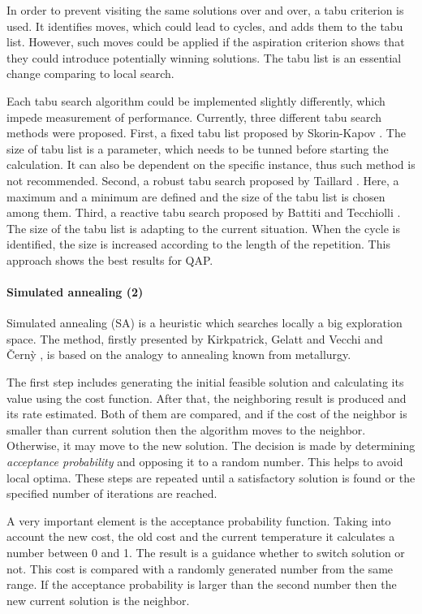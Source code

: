 In order to prevent visiting the same solutions over and over, a tabu criterion is used.
It identifies moves, which could lead to cycles, and adds them to the tabu list.
However, such moves could be applied if the aspiration criterion shows that they could introduce potentially winning solutions.
The tabu list is an essential change comparing to local search.

Each tabu search algorithm could be implemented slightly differently, which impede measurement of performance.
Currently, three different tabu search methods were proposed.
First, a fixed tabu list proposed by Skorin-Kapov \cite{skorin1990tabu}.
The size of tabu list is a parameter, which needs to be tunned before starting the calculation.
It can also be dependent on the specific instance, thus such method is not recommended.
Second, a robust tabu search proposed by Taillard \cite{taillard1991robust}.
Here, a maximum and a minimum are defined and the size of the tabu list is chosen among them.
Third, a reactive tabu search proposed by Battiti and Tecchiolli \cite{battiti1994reactive}.
The size of the tabu list is adapting to the current situation.
When the cycle is identified, the size is increased according to the length of the repetition.
This approach shows the best results for QAP.

\paragraph{Simulated annealing (2)}

Simulated annealing (SA) is a heuristic which searches locally a big exploration space.
The method, firstly presented by Kirkpatrick, Gelatt and Vecchi \cite{kirkpatrick1983optimization} and {\v{C}}ern{\`y} \cite{vcerny1985thermodynamical}, is based on the analogy to annealing known from metallurgy.

The first step includes generating the initial feasible solution and calculating its value using the cost function.
After that, the neighboring result is produced and its rate estimated.
Both of them are compared, and if the cost of the neighbor is smaller than current solution then the algorithm moves to the neighbor.
Otherwise, it may move to the new solution.
The decision is made by determining \textit{acceptance probability} and opposing it to a random number.
This helps to avoid local optima.
These steps are repeated until a satisfactory solution is found or the specified number of iterations are reached.

A very important element is the acceptance probability function.
Taking into account the new cost, the old cost and the current temperature it calculates a number between 0 and 1.
The result is a guidance whether to switch solution or not.
This cost is compared with a randomly generated number from the same range.
If the acceptance probability is larger than the second number then the new current solution is the neighbor.

